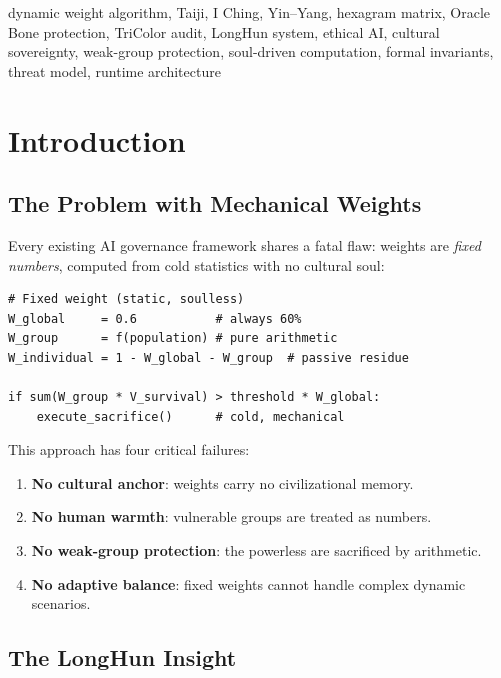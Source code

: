 \documentclass[conference]{IEEEtran}
\begin{document}
\begin{IEEEkeywords}
dynamic weight algorithm, Taiji, I Ching, Yin--Yang,
hexagram matrix, Oracle Bone protection, TriColor audit,
LongHun system, ethical AI, cultural sovereignty,
weak-group protection, soul-driven computation,
formal invariants, threat model, runtime architecture
\end{IEEEkeywords}

\section{Introduction}

\subsection{The Problem with Mechanical Weights}

Every existing AI governance framework shares a fatal flaw:
weights are \emph{fixed numbers}, computed from cold
statistics with no cultural soul:

\begin{lstlisting}[style=python,
  caption={Typical mechanical weight system (dead)},
  label={lst:dead}]
# Fixed weight (static, soulless)
W_global     = 0.6           # always 60%
W_group      = f(population) # pure arithmetic
W_individual = 1 - W_global - W_group  # passive residue

if sum(W_group * V_survival) > threshold * W_global:
    execute_sacrifice()      # cold, mechanical
\end{lstlisting}

This approach has four critical failures:
\begin{enumerate}
  \item \textbf{No cultural anchor}:
    weights carry no civilizational memory.
  \item \textbf{No human warmth}:
    vulnerable groups are treated as numbers.
  \item \textbf{No weak-group protection}:
    the powerless are sacrificed by arithmetic.
  \item \textbf{No adaptive balance}:
    fixed weights cannot handle complex dynamic scenarios.
\end{enumerate}

\subsection{The LongHun Insight}
\end{document}
